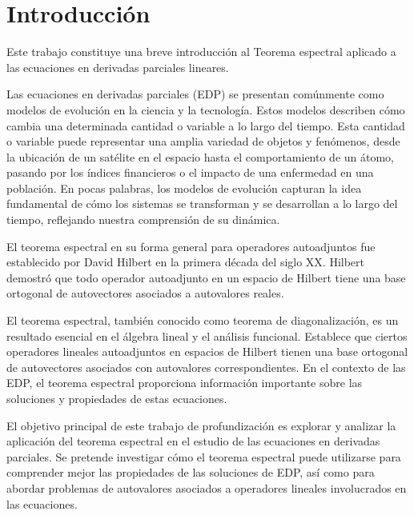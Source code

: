 \documentclass{article}
\begin{document}
\newpage


\section{Introducción}
Este trabajo constituye una breve introducción al Teorema espectral aplicado a las ecuaciones en derivadas parciales lineares.

Las ecuaciones en derivadas parciales (EDP) se presentan comúnmente como modelos de evolución en la ciencia y la tecnología. Estos modelos describen cómo cambia una determinada cantidad o variable a lo largo del tiempo. Esta cantidad o variable puede representar una amplia variedad de objetos y fenómenos, desde la ubicación de un satélite en el espacio hasta el comportamiento de un átomo, pasando por los índices financieros o el impacto de una enfermedad en una población. En pocas palabras, los modelos de evolución capturan la idea fundamental de cómo los sistemas se transforman y se desarrollan a lo largo del tiempo, reflejando nuestra comprensión de su dinámica.

El teorema espectral en su forma general para operadores autoadjuntos fue establecido por David Hilbert en la primera década del siglo XX. Hilbert demostró que todo operador autoadjunto en un espacio de Hilbert tiene una base ortogonal de autovectores asociados a autovalores reales.

El teorema espectral, también conocido como teorema de diagonalización, es un resultado esencial en el álgebra lineal y el análisis funcional. Establece que ciertos operadores lineales autoadjuntos en espacios de Hilbert tienen una base ortogonal de autovectores asociados con autovalores correspondientes. En el contexto de las EDP, el teorema espectral proporciona información importante sobre las soluciones y propiedades de estas ecuaciones.

El objetivo principal de este trabajo de profundización es explorar y analizar la aplicación del teorema espectral en el estudio de las ecuaciones en derivadas parciales. Se pretende investigar cómo el teorema espectral puede utilizarse para comprender mejor las propiedades de las soluciones de EDP, así como para abordar problemas de autovalores asociados a operadores lineales involucrados en las ecuaciones.
\end{document}

